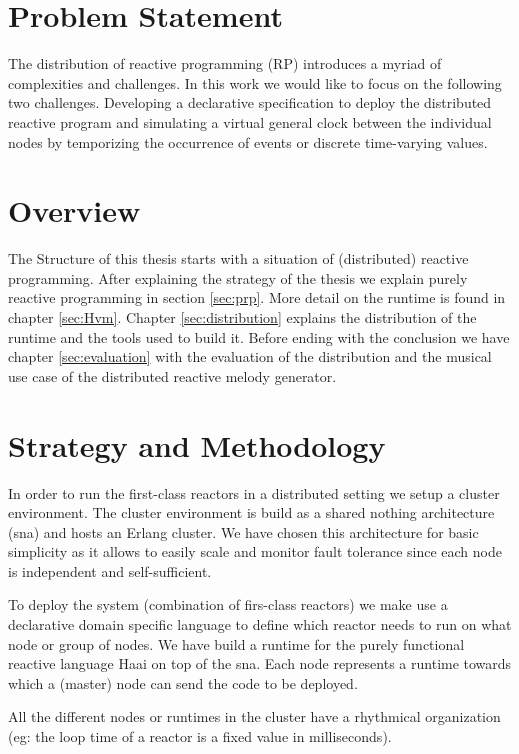 \documentclass[a4paper]{book}
\begin{document}
\section{Problem Statement}
The distribution of reactive programming (RP) introduces a myriad of complexities and challenges. In this work we would like to focus on the following two challenges. Developing a declarative specification to deploy the distributed reactive program and simulating a virtual general clock between the individual nodes by temporizing the occurrence of events or discrete time-varying values.  

\section{Overview}
The Structure of this thesis starts with a situation of (distributed) reactive programming. After explaining the strategy of the thesis we explain purely reactive programming in section \ref{sec:prp}. More detail on the runtime is found in chapter \ref{sec:Hvm}. Chapter \ref{sec:distribution} explains the distribution of the runtime and the tools used to build it. Before ending with the conclusion we have chapter \ref{sec:evaluation} with the evaluation of the distribution and the musical use case of the distributed reactive melody generator. 

\section{Strategy and Methodology}

In order to run the first-class reactors in a distributed setting we setup a cluster environment. The cluster environment is build as a shared nothing architecture (sna) and hosts an Erlang cluster. We have chosen this architecture for basic simplicity as it allows to easily scale and monitor fault tolerance since each node is independent and self-sufficient.

To deploy the system (combination of firs-class reactors) we make use a declarative domain specific language to define which reactor needs to run on what node or group of nodes. We have build a runtime for the purely functional reactive language Haai on top of the sna. Each node represents a runtime towards which a (master) node can send the code to be deployed.

All the different nodes or runtimes in the cluster have a rhythmical organization (eg: the loop time of a reactor is a fixed value in milliseconds).   
\end{document}
